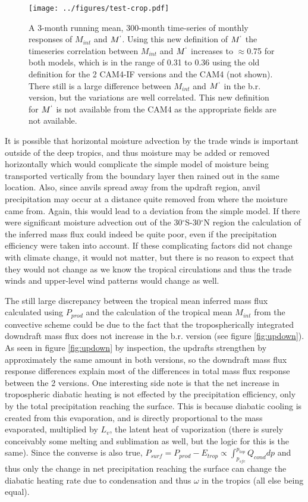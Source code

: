 \documentclass[letterpaper,12pt,titlepage,oneside,final]{book}
\begin{document}
\begin{figure}[H]
\centering
\noindent\texttt{[image: ../figures/test-crop.pdf]}\hfill
\caption{A 3-month running mean, 300-month time-series of monthly responses of $M_{int}$ and $M^{`}$. Using this new definition of $M^{`}$ the timeseries correlation between $M_{int}$ and $M^{`}$ increases to $\approx$0.75 for both models, which is in the range of 0.31 to 0.36 using the old definition for the 2 CAM4-IF versions and the CAM4 (not shown). There still is a large difference between $M_{int}$ and $M^{`}$ in the b.r. version, but the variations are well correlated. This new definition for $M^{`}$ is not available from the CAM4 as the appropriate fields are not available.}
\end{figure}

It is possible that horizontal moisture advection by the trade winds is important outside of the deep tropics, and thus moisture may be added or removed horizontally which would complicate the simple model of moisture being transported vertically from the boundary layer then rained out in the same location. Also, since anvils spread away from the updraft region, anvil precipitation may occur at a distance quite removed from where the moisture came from. Again, this would lead to a deviation from the simple model. If there were significant moisture advection out of the 30$^{\circ}$S-30$^{\circ}$N region the calculation of the inferred mass flux could indeed be quite poor, even if the precipitation efficiency were taken into account. If these complicating factors did not change with climate change, it would not matter, but there is no reason to expect that they would not change as we know the tropical circulations and thus the trade winds and upper-level wind patterns would change as well. 

The still large discrepancy between the tropical mean inferred mass flux calculated using $P_{prod}$ and the calculation of the tropical mean $M_{int}$ from the convective scheme could be due to the fact that the tropospherically integrated downdraft mass flux does not increase in the b.r. version (see figure \ref{fig:updown}). As seen in figure \ref{fig:updown} by inspection, the updrafts strengthen by approximately the same amount in both versions, so the downdraft mass flux response differences explain most of the differences in total mass flux response between the 2 versions. One interesting side note is that the net increase in tropospheric diabatic heating is not effected by the precipitation efficiency, only by the total precipitation reaching the surface. This is because diabatic cooling is created from this evaporation, and is directly proportional to the mass evaporated, multiplied by $L_{v}$, the latent heat of vaporization (there is surely conceivably some melting and sublimation as well, but the logic for this is the same). Since the converse is also true, $P_{surf}=P_{prod}-E_{trop} \propto \int_{p_{sfc}}^{p_{top}}Q_{cond}dp$ and thus only the change in net precipitation reaching the surface can change the diabatic heating rate due to condensation and thus $\omega$ in the tropics (all else being equal).
\end{document}
